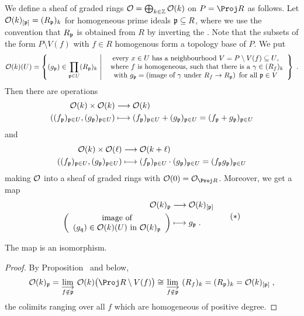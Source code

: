 \documentclass[a4paper,parskip=half,numbers=enddot, DIV=12]{scrreprt}
\begin{document}
We define a sheaf of graded rings $\mathcal{O}=\bigoplus_{k\in\mathbb{Z}}\mathcal{O}(k)$ on $P=\Proj R$ as follows. Let $\mathcal{O}(k)_{[\mathfrak{p}]}=(R_{\mathfrak{p}})_k$ for homogeneous prime ideals $\mathfrak{p}\subseteq R$, where we use the convention that $R_{\mathfrak{p}}$ is obtained from $R$ by inverting the . Note that the subsets of the form $P\setminus V(f)$ with $f\in R$ homogenous form a topology base of $P$. We put
\begin{align*}
	\Oo(k)(U)=\left\{(g_\pp)\in\prod_{\pp\in U}(R_\pp)_k\st\begin{array}{c}
		\text{every }x\in U\text{ has a neighbourhood }V=P\setminus V(f)\subseteq U\text{,}\\
		\text{ where }f\text{ is homogeneous,  such that there is a }\gamma\in (R_f)_k\\
		\text{with }g_\pp=\left(\text{image of }\gamma\text{ under }R_f\morphism R_\pp\right)\text{ for all }\pp\in V
	\end{array}\right\}\;.
\end{align*}
Then there are operations
\begin{align*}
	\Oo(k)\times \Oo(k)&\morphism \Oo(k)\\
	\left((f_\pp)_{\pp\in U},(g_\pp)_{\pp\in U}\right)&\longmapsto (f_\pp)_{\pp\in U}+(g_\pp)_{\pp\in U}=(f_\pp+g_\pp)_{\pp\in U}
\end{align*}
and
\begin{align*}
	\Oo(k)\times \Oo(\ell)&\morphism \Oo(k+\ell)\\
	\left((f_\pp)_{\pp\in U},(g_\pp)_{\pp\in U}\right)&\longmapsto (f_\pp)_{\pp\in U}\cdot (g_\pp)_{\pp\in U}=(f_\pp g_\pp)_{\pp\in U}	
\end{align*}
making $\mathcal{O}$ into a sheaf of graded rings with $\Oo(0)=\Oo_{\Proj R}$. Moreover, we get a map
\begin{align}\lbl{eq:ProjPretenderStalk}
	\begin{split}
		\Oo(k)_\pp&\morphism\Oo(k)_{[\pp]}\\
		\left(\begin{array}{c}
			\text{image of}\\
			(g_\qq)\in\Oo(k)(U)\text{ in }\Oo(k)_\pp
		\end{array}\right)&\longmapsto g_\pp\;.
	\end{split}\tag{$*$}
\end{align}
\begin{fact}
	The map  is an isomorphism.
\end{fact}
\begin{proof}
	By Proposition~ and  below, 
	\begin{align*}
		\Oo(k)_\pp=\colimit[f\notin \pp]\Oo(k)\big(\Proj R\setminus V(f)\big)\cong \colimit[f\notin\pp](R_f)_k=(R_\pp)_k=\Oo(k)_{[\pp]}\;,
	\end{align*}
	the colimits ranging over all $f$ which are homogeneous of positive degree.
\end{proof}
\end{document}

